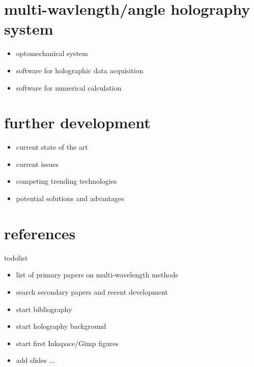 \documentclass[t, aspectratio=169]{beamer}
\begin{document}
\section{multi-wavlength/angle holography system}

\begin{frame}{\secname}
	\begin{itemize}
		\item optomechanical system
		\item software for holographic data acquisition
		\item software for numerical calculation
	\end{itemize}
\end{frame}


\section{further development}

\begin{frame}{\secname}
	\begin{itemize}
		\item current state of the art
		\item current issues
		\item competing trending technologies
		\item potential solutions and advantages
	\end{itemize}
\end{frame}


\section{references}


\frame{}


\begin{frame}{todolist}
	\begin{itemize}
		\item list of primary papers on multi-wavelength methods
		\item search secondary papers and recent development
		\item start bibliography
		\item start holography background
		\item start first Inkspace/Gimp figures
		\item add slides ...
	\end{itemize}
\end{frame}
\end{document}
